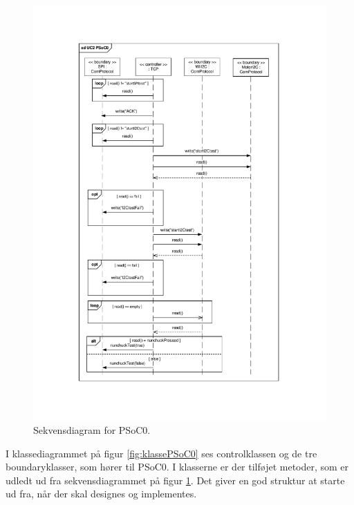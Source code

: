 \begin{figure}[H]
	\centering
	\includegraphics[trim = {3.2cm 2.6cm 3.3cm 2.7cm}, clip = true, width=\textwidth] {Systemarkitektur/images/SekvensdiagramPSoC0.pdf}
	\caption{Sekvensdiagram for PSoC0.}
	\label{fig:sekvensPSoC0}
\end{figure}

I klassediagrammet på figur \ref{fig:klassePSoC0} ses controlklassen og de tre boundaryklasser, som hører til PSoC0. I klasserne er der tilføjet metoder, som er udledt ud fra sekvensdiagrammet på figur \ref{fig:sekvensPSoC0}. Det giver en god struktur at starte ud fra, når der skal designes og implementes. 

